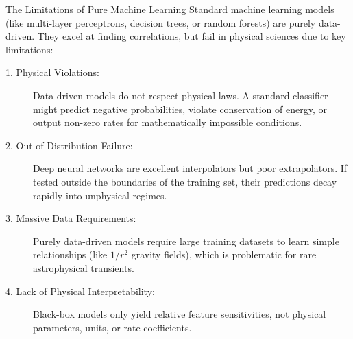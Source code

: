 \documentclass[9pt]{beamer}
\begin{document}
\begin{frame}{The Limitations of Pure Machine Learning}
  Standard machine learning models (like multi-layer perceptrons, decision trees, or random forests) are purely data-driven. They excel at finding correlations, but fail in physical sciences due to key limitations:
  \begin{description}
    \item[1. Physical Violations:] Data-driven models do not respect physical laws. A standard classifier might predict negative probabilities, violate conservation of energy, or output non-zero rates for mathematically impossible conditions.
    \item[2. Out-of-Distribution Failure:] Deep neural networks are excellent interpolators but poor extrapolators. If tested outside the boundaries of the training set, their predictions decay rapidly into unphysical regimes.
    \item[3. Massive Data Requirements:] Purely data-driven models require large training datasets to learn simple relationships (like $1/r^2$ gravity fields), which is problematic for rare astrophysical transients.
    \item[4. Lack of Physical Interpretability:] Black-box models only yield relative feature sensitivities, not physical parameters, units, or rate coefficients.
  \end{description}
\end{frame}
\end{document}

